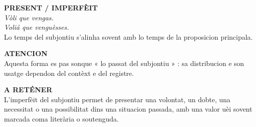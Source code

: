 \documentclass[a4paper,11pt]{article}
\begin{document}
\begin{minipage}{0.91\textwidth}
\begin{minipage}{.485\textwidth}\begin{bluebox}[height=3.15cm]
\textbf{\color{BlueDark}PRESENT / IMPERFÈIT}\\[1mm]
\textit{Vòli que vengas.}\\
\textit{Voliá que venguèsses.}\\[1mm]
Lo temps del subjontiu s'alinha sovent amb lo temps de la proposicion principala.
\end{bluebox}\end{minipage}\hfill
\begin{minipage}{.485\textwidth}\begin{warnbox}[height=3.15cm]
\textbf{\color{Red}ATENCION}\\[1mm]
Aquesta forma es pas sonque « lo passat del subjontiu » : sa distribucion e son usatge dependon del contèxt e del registre.
\end{warnbox}\end{minipage}
\vspace{2mm}
\begin{bluebox}\textbf{\color{BlueDark}A RETÉNER}\\[1mm]
L'imperfèit del subjontiu permet de presentar una volontat, un dobte, una necessitat o una possibilitat dins una situacion passada, amb una valor uèi sovent marcada coma literària o soutenguda.
\end{bluebox}
\vspace{1.5mm}
\end{minipage}
\end{document}
